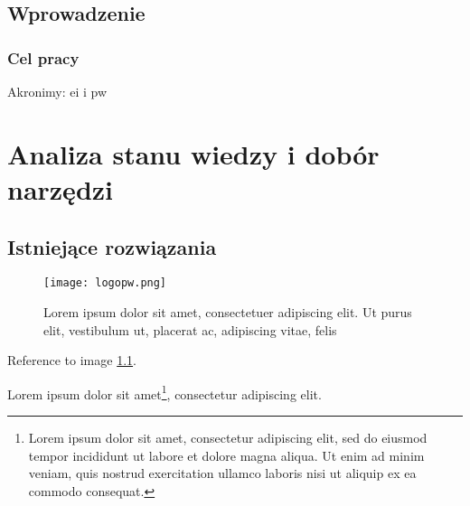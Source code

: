 \chapter*{Wprowadzenie}
    \noindent\lipsum[1-5]


        \section*{Cel pracy}
        \noindent\lipsum[6-8]
        Akronimy: \ac{ei} i \ac{pw}

\cleardoublepage
\part{Analiza stanu wiedzy i dobór narzędzi}
\noindent\lipsum[1-3]
\clearpage\chapter{Istniejące rozwiązania}
\noindent\lipsum[1-3]

\begin{figure}[!h]
    \centering \texttt{[image: logopw.png]}
    
    \caption{Lorem ipsum dolor sit amet, consectetuer adipiscing elit. Ut purus
    elit, vestibulum ut, placerat ac, adipiscing vitae, felis}
    \label{fig:tradycyjne-logo-pw}
\end{figure}

\lipsum[1-3] Reference to image \ref{fig:tradycyjne-logo-pw}.

\lipsum[4] Lorem ipsum dolor sit amet\footnote{Lorem ipsum dolor sit amet, consectetur adipiscing elit, sed do eiusmod tempor incididunt ut labore et dolore magna aliqua. Ut enim ad minim veniam, quis nostrud exercitation ullamco laboris nisi ut aliquip ex ea commodo consequat.}, consectetur adipiscing elit.

